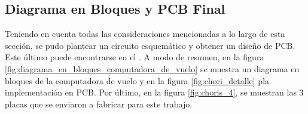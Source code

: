 

\subsection{Diagrama en Bloques y PCB Final}



Teniendo en cuenta todas las consideraciones mencionadas a lo largo de esta sección, se pudo plantear un circuito esquemático y obtener un diseño de PCB. Este último puede encontrarse en el . A modo de resumen, en la figura \ref{fig:diagrama_en_bloques_computadora_de_vuelo} se muestra un diagrama en bloques de la computadora de vuelo y en la figura \ref{fig:chori_detalle} pla implementación en PCB. Por último, en la figura \ref{fig:choris_4}, se muestran las 3 placas que se enviaron a fabricar para este trabajo.



